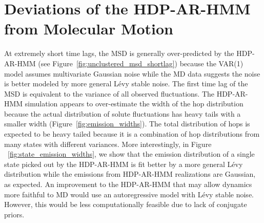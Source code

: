 \documentclass{article}
\begin{document}
  \section{Deviations of the HDP-AR-HMM from Molecular Motion}\label{section:shorttimes_msd}
  
  At extremely short time lags, the MSD is generally over-predicted by the HDP-AR-HMM
  (see Figure~\ref{fig:unclustered_msd_shortlag}) because the VAR(1) model assumes
  multivariate Gaussian noise while the MD data suggests the noise is better 
  modeled by more general L\'evy stable noise. The first time lag of the MSD is
  equivalent to the variance of all observed fluctuations. 
  The HDP-AR-HMM simulation appears to over-estimate the width of the hop distribution
  because the actual distribution of solute fluctuations has 
  heavy tails with a smaller width (Figure~\ref{fig:emission_widths}).
  The total distribution of hops is expected to be heavy tailed because it is a
  combination of hop distributions from many states with different variances. More
  interestingly, in Figure ~\ref{fig:state_emission_widths}, we show that the 
  emission distribution of a single state picked out by the HDP-AR-HMM is fit better by
  a more general L\'evy distribution while the emissions from HDP-AR-HMM realizations are
  Gaussian, as expected. An improvement to the HDP-AR-HMM that may allow dynamics more 
  faithful to MD would use an autoregressive model with L\'evy stable noise. However,
  this would be less computationally feasible due to lack of conjugate priors.
  
\end{document}
